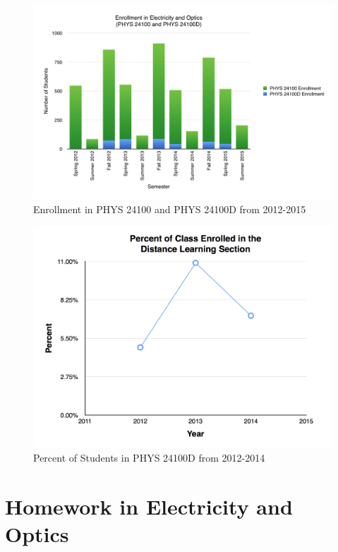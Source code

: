 \begin{figure}
	\centering
	\includegraphics[width=5in]{img/chapter1/enrollment}
	\caption[Enrollment in PHYS 24100 and PHYS 24100D from 2012-2015]{Enrollment in PHYS 24100 and PHYS 24100D from 2012-2015}
	\label{fig:enrollment}
\end{figure}

\begin{figure}
	\centering
	\includegraphics[width=5in]{img/chapter1/percent}
	\caption[Percent of Students in PHYS 24100D from 2012-2014]{Percent of Students in PHYS 24100D from 2012-2014}
	\label{fig:percent}
\end{figure}

\section{Homework in Electricity and Optics}

